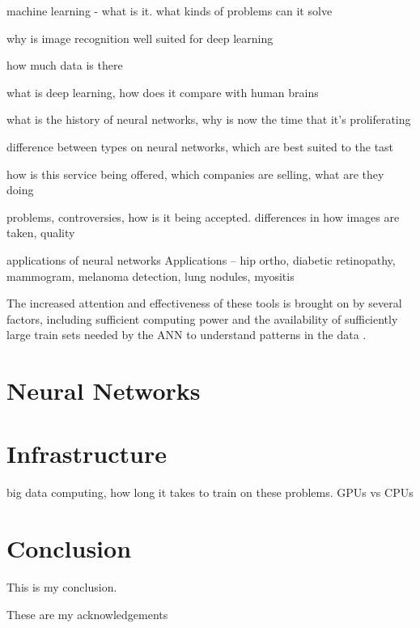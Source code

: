 \documentclass[sigconf]{acmart}
\begin{document}
machine learning - what is it. what kinds of problems can it solve

why is image recognition well suited for deep learning

how much data is there

what is deep learning, how does it compare with human brains

what is the history of neural networks, why is now the time that it's proliferating

difference between types on neural networks, which are best suited to the tast

how is this service being offered, which companies are selling, what are they doing

problems, controversies, how is it being accepted. differences in how images are taken, quality

applications of neural networks Applications – hip ortho, diabetic retinopathy, mammogram, melanoma detection, lung nodules, myositis

The increased attention and effectiveness of these tools is brought on by several factors, including sufficient computing power and the availability of sufficiently large train sets needed by the ANN to understand patterns in the data \cite{editor00}.

\section{Neural Networks}

\section{Infrastructure}

big data computing, how long it takes to train on these problems. GPUs vs CPUs

\section{Conclusion}

 This is my conclusion.

 
\begin{acks}

 These are my acknowledgements

\end{acks}



 


\appendix
 


\end{document}
